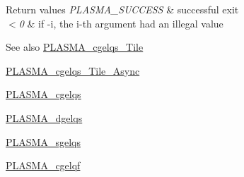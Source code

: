 \begin{DoxyRetVals}{Return values}
{\em P\+L\+A\+S\+M\+A\+\_\+\+S\+U\+C\+C\+E\+S\+S} & successful exit \\
\hline
{\em $<$0} & if -\/i, the i-\/th argument had an illegal value\\
\hline
\end{DoxyRetVals}
\begin{DoxySeeAlso}{See also}
\hyperlink{group__PLASMA__Complex32__t__Tile_gae806b15d37f50313a6a04c46d4d194da_gae806b15d37f50313a6a04c46d4d194da}{P\+L\+A\+S\+M\+A\+\_\+cgelqs\+\_\+\+Tile} 

\hyperlink{group__PLASMA__Complex32__t__Tile__Async_gaf0c1cbccdaaa9731b193bf271b58fdb9_gaf0c1cbccdaaa9731b193bf271b58fdb9}{P\+L\+A\+S\+M\+A\+\_\+cgelqs\+\_\+\+Tile\+\_\+\+Async} 

\hyperlink{group__PLASMA__Complex32__t_gab6c2a5892b81e8ee9740268d06adf9b1_gab6c2a5892b81e8ee9740268d06adf9b1}{P\+L\+A\+S\+M\+A\+\_\+cgelqs} 

\hyperlink{group__double_ga092545f106c9fae67b82eb65f11ca4ab_ga092545f106c9fae67b82eb65f11ca4ab}{P\+L\+A\+S\+M\+A\+\_\+dgelqs} 

\hyperlink{group__float_ga4bde040498b35dcbc88268de59de7d12_ga4bde040498b35dcbc88268de59de7d12}{P\+L\+A\+S\+M\+A\+\_\+sgelqs} 

\hyperlink{group__PLASMA__Complex32__t_gadab1e78967134c5e784bb80d03760b25_gadab1e78967134c5e784bb80d03760b25}{P\+L\+A\+S\+M\+A\+\_\+cgelqf} 
\end{DoxySeeAlso}
\hypertarget{group__PLASMA__Complex32__t_ga047c51e0c630ac15b2679b8352013f7b_ga047c51e0c630ac15b2679b8352013f7b}{}
